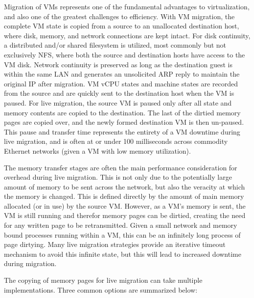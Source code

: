 
Migration of VMs represents one of the fundamental advantages to virtualization, and also one of the greatest challenges to efficiency.  With VM migration, the complete VM state is copied from a source to an unallocated destination host, where disk, memory, and network connections are kept intact. For disk continuity, a distributed and/or shared filesystem is utilized, most commonly but not exclusively NFS, where both the source and destination hosts have access to the VM disk.  Network continuity is preserved as long as the destination guest is within the same LAN and generates an unsolicited ARP reply to maintain the original IP after migration.  VM vCPU states and machine states are recorded from the source and are quickly sent to the destination host when the VM is paused. For live migration, the source VM is paused only after all state and memory contents are copied to the destination. The last of the dirtied memory pages are copied over, and the newly formed destination VM is then un-paused.  This pause and transfer time represents the entirety of a VM downtime during live migration, and is often at or under 100 milliseconds across commodity Ethernet networks (given a VM with low memory utilization).  

The memory transfer stages are often the main performance consideration for overhead during live migration. This is not only due to the potentially large amount of memory to be sent across the network, but also the veracity at which the memory is changed.  This is defined directly by the amount of main memory allocated (or in use) by the source VM. However, as a VM's memory is sent, the VM is still running and therefor memory pages can be dirtied, creating the need for any written page to be retransmitted. Given a small network and memory bound processes running within a VM, this can be an infinitely long process of page dirtying. Many live migration strategies provide an iterative timeout mechanism to avoid this infinite state, but this will lead to increased downtime during migration.  

The copying of memory pages for live migration can take multiple implementations. Three common options are summarized below:

